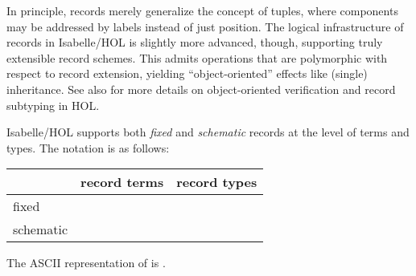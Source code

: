 \begin{isabellebody}
\begin{isamarkuptext}
\begin{description}
  \end{description}%
\end{isamarkuptext}%
\isamarkuptrue%
%
\isamarkuptrue%
%
\begin{isamarkuptext}%
In principle, records merely generalize the concept of tuples, where
  components may be addressed by labels instead of just position.  The
  logical infrastructure of records in Isabelle/HOL is slightly more
  advanced, though, supporting truly extensible record schemes.  This
  admits operations that are polymorphic with respect to record
  extension, yielding ``object-oriented'' effects like (single)
  inheritance.  See also \cite{NaraschewskiW-TPHOLs98} for more
  details on object-oriented verification and record subtyping in HOL.%
\end{isamarkuptext}%
\isamarkuptrue%
%
\isamarkuptrue%
%
\begin{isamarkuptext}%
Isabelle/HOL supports both \emph{fixed} and \emph{schematic} records
  at the level of terms and types.  The notation is as follows:

  \begin{center}
  \begin{tabular}{l|l|l}
    & record terms & record types \\ \hline
    fixed & \isa{{\isachardoublequote}{\isasymlparr}x\ {\isacharequal}\ a{\isacharcomma}\ y\ {\isacharequal}\ b{\isasymrparr}{\isachardoublequote}} & \isa{{\isachardoublequote}{\isasymlparr}x\ {\isacharcolon}{\isacharcolon}\ A{\isacharcomma}\ y\ {\isacharcolon}{\isacharcolon}\ B{\isasymrparr}{\isachardoublequote}} \\
    schematic & \isa{{\isachardoublequote}{\isasymlparr}x\ {\isacharequal}\ a{\isacharcomma}\ y\ {\isacharequal}\ b{\isacharcomma}\ {\isasymdots}\ {\isacharequal}\ m{\isasymrparr}{\isachardoublequote}} &
      \isa{{\isachardoublequote}{\isasymlparr}x\ {\isacharcolon}{\isacharcolon}\ A{\isacharcomma}\ y\ {\isacharcolon}{\isacharcolon}\ B{\isacharcomma}\ {\isasymdots}\ {\isacharcolon}{\isacharcolon}\ M{\isasymrparr}{\isachardoublequote}} \\
  \end{tabular}
  \end{center}

  \noindent The ASCII representation of  is .


\end{isamarkuptext}
\end{isabellebody}
